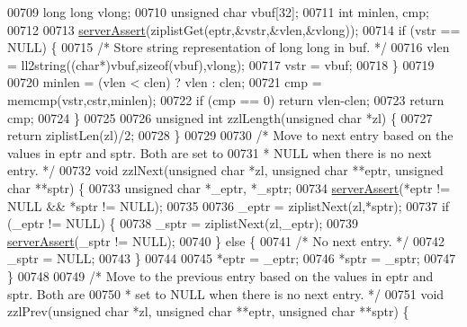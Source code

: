 \begin{DoxyCode}
00709     \textcolor{keywordtype}{long} \textcolor{keywordtype}{long} vlong;
00710     \textcolor{keywordtype}{unsigned} \textcolor{keywordtype}{char} vbuf[32];
00711     \textcolor{keywordtype}{int} minlen, cmp;
00712 
00713     \hyperlink{server_8h_a88114b5169b4c382df6b56506285e56a}{serverAssert}(ziplistGet(eptr,&vstr,&vlen,&vlong));
00714     \textcolor{keywordflow}{if} (vstr == NULL) \{
00715         \textcolor{comment}{/* Store string representation of long long in buf. */}
00716         vlen = ll2string((\textcolor{keywordtype}{char}*)vbuf,\textcolor{keyword}{sizeof}(vbuf),vlong);
00717         vstr = vbuf;
00718     \}
00719 
00720     minlen = (vlen < clen) ? vlen : clen;
00721     cmp = memcmp(vstr,cstr,minlen);
00722     \textcolor{keywordflow}{if} (cmp == 0) \textcolor{keywordflow}{return} vlen-clen;
00723     \textcolor{keywordflow}{return} cmp;
00724 \}
00725 
00726 \textcolor{keywordtype}{unsigned} \textcolor{keywordtype}{int} zzlLength(\textcolor{keywordtype}{unsigned} \textcolor{keywordtype}{char} *zl) \{
00727     \textcolor{keywordflow}{return} ziplistLen(zl)/2;
00728 \}
00729 
00730 \textcolor{comment}{/* Move to next entry based on the values in eptr and sptr. Both are set to}
00731 \textcolor{comment}{ * NULL when there is no next entry. */}
00732 \textcolor{keywordtype}{void} zzlNext(\textcolor{keywordtype}{unsigned} \textcolor{keywordtype}{char} *zl, \textcolor{keywordtype}{unsigned} \textcolor{keywordtype}{char} **eptr, \textcolor{keywordtype}{unsigned} \textcolor{keywordtype}{char} **sptr) \{
00733     \textcolor{keywordtype}{unsigned} \textcolor{keywordtype}{char} *\_eptr, *\_sptr;
00734     \hyperlink{server_8h_a88114b5169b4c382df6b56506285e56a}{serverAssert}(*eptr != NULL && *sptr != NULL);
00735 
00736     \_eptr = ziplistNext(zl,*sptr);
00737     \textcolor{keywordflow}{if} (\_eptr != NULL) \{
00738         \_sptr = ziplistNext(zl,\_eptr);
00739         \hyperlink{server_8h_a88114b5169b4c382df6b56506285e56a}{serverAssert}(\_sptr != NULL);
00740     \} \textcolor{keywordflow}{else} \{
00741         \textcolor{comment}{/* No next entry. */}
00742         \_sptr = NULL;
00743     \}
00744 
00745     *eptr = \_eptr;
00746     *sptr = \_sptr;
00747 \}
00748 
00749 \textcolor{comment}{/* Move to the previous entry based on the values in eptr and sptr. Both are}
00750 \textcolor{comment}{ * set to NULL when there is no next entry. */}
00751 \textcolor{keywordtype}{void} zzlPrev(\textcolor{keywordtype}{unsigned} \textcolor{keywordtype}{char} *zl, \textcolor{keywordtype}{unsigned} \textcolor{keywordtype}{char} **eptr, \textcolor{keywordtype}{unsigned} \textcolor{keywordtype}{char} **sptr) \{

\end{DoxyCode}

